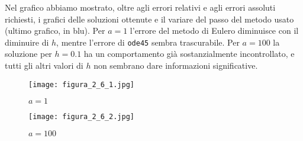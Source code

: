 \documentclass{article}
\begin{document}
\noindent
Nel grafico abbiamo mostrato, oltre agli errori relativi e agli errori assoluti richiesti, i grafici delle soluzioni ottenute e il variare del passo del metodo usato (ultimo grafico, in blu).
Per $a=1$ l'errore del metodo di Eulero diminuisce con il diminuire di $h$, mentre l'errore di \texttt{ode45} sembra trascurabile. Per $a=100$ la soluzione per $h=0.1$ ha un comportamento già sostanzialmente incontrollato, e tutti gli altri valori di $h$ non sembrano dare informazioni significative.
\begin{figure}[!ht]
\centering
\texttt{[image: figura\_2\_6\_1.jpg]}
\caption{$a=1$}
\end{figure}
\begin{figure}[!ht]
\centering
\texttt{[image: figura\_2\_6\_2.jpg]}
\caption{$a=100$}
\end{figure}
\end{document}
